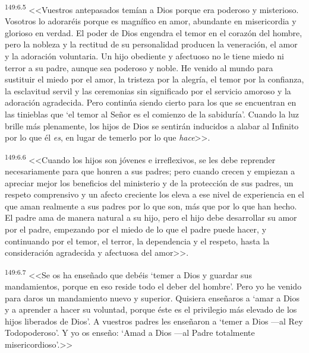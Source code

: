 \par 
\textsuperscript{149:6.5} <<Vuestros antepasados temían a Dios porque era poderoso y misterioso. Vosotros lo adoraréis porque es magnífico en amor, abundante en misericordia y glorioso en verdad. El poder de Dios engendra el temor en el corazón del hombre, pero la nobleza y la rectitud de su personalidad producen la veneración, el amor y la adoración voluntaria. Un hijo obediente y afectuoso no le tiene miedo ni terror a su padre, aunque sea poderoso y noble. He venido al mundo para sustituir el miedo por el amor, la tristeza por la alegría, el temor por la confianza, la esclavitud servil y las ceremonias sin significado por el servicio amoroso y la adoración agradecida. Pero continúa siendo cierto para los que se encuentran en las tinieblas que `el temor al Señor es el comienzo de la sabiduría'. Cuando la luz brille más plenamente, los hijos de Dios se sentirán inducidos a alabar al Infinito por lo que él \textit{es}, en lugar de temerlo por lo que \textit{hace}>>.

\par 
\textsuperscript{149:6.6} <<Cuando los hijos son jóvenes e irreflexivos, se les debe reprender necesariamente para que honren a sus padres; pero cuando crecen y empiezan a apreciar mejor los beneficios del ministerio y de la protección de sus padres, un respeto comprensivo y un afecto creciente los eleva a ese nivel de experiencia en el que aman realmente a sus padres por lo que son, más que por lo que han hecho. El padre ama de manera natural a su hijo, pero el hijo debe desarrollar su amor por el padre, empezando por el miedo de lo que el padre puede hacer, y continuando por el temor, el terror, la dependencia y el respeto, hasta la consideración agradecida y afectuosa del amor>>.

\par 
\textsuperscript{149:6.7} <<Se os ha enseñado que debéis `temer a Dios y guardar sus mandamientos, porque en eso reside todo el deber del hombre'. Pero yo he venido para daros un mandamiento nuevo y superior. Quisiera enseñaros a `amar a Dios y a aprender a hacer su voluntad, porque éste es el privilegio más elevado de los hijos liberados de Dios'. A vuestros padres les enseñaron a `temer a Dios ---al Rey Todopoderoso'. Y yo os enseño: `Amad a Dios ---al Padre totalmente misericordioso'.>>

